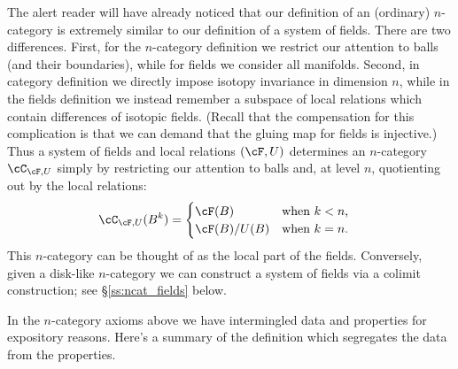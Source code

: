 The alert reader will have already noticed that our definition of an (ordinary) $n$-category
is extremely similar to our definition of a system of fields.
There are two differences.
First, for the $n$-category definition we restrict our attention to balls
(and their boundaries), while for fields we consider all manifolds.
Second,  in category definition we directly impose isotopy
invariance in dimension $n$, while in the fields definition we 
instead remember a subspace of local relations which contain differences of isotopic fields. 
(Recall that the compensation for this complication is that we can demand that the gluing map for fields is injective.)
Thus a system of fields and local relations $(\cF,U)$ determines an $n$-category $\cC_ {\cF,U}$ simply by restricting our attention to
balls and, at level $n$, quotienting out by the local relations:
\begin{align*}
\cC_{\cF,U}(B^k) & = \begin{cases}\cF(B) & \text{when $k<n$,} \\ \cF(B) / U(B) & \text{when $k=n$.}\end{cases}
\end{align*}
This $n$-category can be thought of as the local part of the fields.
Conversely, given a disk-like $n$-category we can construct a system of fields via 
a colimit construction; see \S \ref{ss:ncat_fields} below.

\medskip

In the $n$-category axioms above we have intermingled data and properties for expository reasons.
Here's a summary of the definition which segregates the data from the properties.

